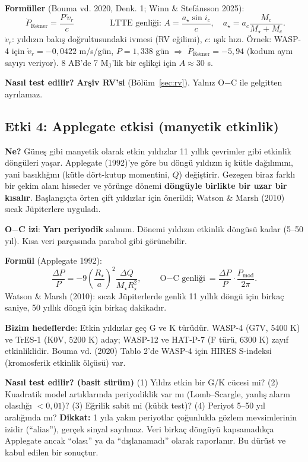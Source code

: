 \textbf{Formüller} (Bouma vd. 2020, Denk. 1; Winn \& Stefánsson 2025):
\[
\boxed{\;\dot P_\text{Rømer} = \frac{P\,\dot v_r}{c}\;}
\qquad\qquad
\text{LTTE genliği: } A = \frac{a_\star \sin i_c}{c},\quad a_\star = a_c\frac{M_c}{M_\star+M_c}.
\]
$\dot v_r$: yıldızın bakış doğrultusundaki ivmesi (RV eğilimi), $c$: ışık hızı. Örnek: WASP-4 için
$\dot v_r = -0{,}0422$ m/s/gün, $P = 1{,}338$ gün $\Rightarrow$ $\dot P_\text{Rømer} = -5{,}94$\msyil{} (kodum aynı sayıyı
veriyor). 8 AB'de 7 M$_\mathrm{J}$'lik bir eşlikçi için $A \approx 30$ s.

\textbf{Nasıl test edilir?} \textbf{Arşiv RV'si} (Bölüm~\ref{sec:rv}). Yalnız O$-$C ile gelgitten ayrılamaz.

\subsection{Etki 4: Applegate etkisi (manyetik etkinlik)}
\textbf{Ne?} Güneş gibi manyetik olarak etkin yıldızlar 11 yıllık çevrimler gibi etkinlik döngüleri yaşar. Applegate
(1992)'ye göre bu döngü yıldızın iç kütle dağılımını, yani basıklığını (kütle dört-kutup momentini, $Q$) değiştirir.
Gezegen biraz farklı bir çekim alanı hisseder ve yörünge dönemi \textbf{döngüyle birlikte bir uzar bir kısalır}.
Başlangıçta örten çift yıldızlar için önerildi; Watson \& Marsh (2010) sıcak Jüpiterlere uyguladı.

\textbf{O$-$C izi}: \textbf{Yarı periyodik} salınım. Dönemi yıldızın etkinlik döngüsü kadar (5–50 yıl). Kısa veri
parçasında parabol gibi görünebilir.

\textbf{Formül} (Applegate 1992):
\[
\frac{\Delta P}{P} = -9\left(\frac{R_\star}{a}\right)^2\frac{\Delta Q}{M_\star R_\star^2},
\qquad
\text{O$-$C genliği} = \frac{\Delta P}{P}\cdot\frac{P_\text{mod}}{2\pi}.
\]
Watson \& Marsh (2010): sıcak Jüpiterlerde genlik 11 yıllık döngü için birkaç saniye, 50 yıllık döngü için birkaç
dakikadır.

\textbf{Bizim hedeflerde}: Etkin yıldızlar geç G ve K türüdür. WASP-4 (G7V, 5400 K) ve TrES-1 (K0V, 5200 K) aday;
WASP-12 ve HAT-P-7 (F türü, 6300 K) zayıf etkinliklidir. Bouma vd. (2020) Tablo 2'de WASP-4 için HIRES S-indeksi
(kromosferik etkinlik ölçüsü) var.

\textbf{Nasıl test edilir? (basit sürüm)} (1) Yıldız etkin bir G/K cücesi mi? (2) Kuadratik model artıklarında
periyodiklik var mı (Lomb–Scargle, yanlış alarm olasılığı $<0{,}01$)? (3) Eğrilik sabit mi (kübik test)?
(4) Periyot 5–50 yıl aralığında mı? \textbf{Dikkat:} 1 yıla yakın periyotlar çoğunlukla gözlem mevsimlerinin izidir
(“alias”), gerçek sinyal sayılmaz. Veri birkaç döngüyü kapsamadıkça Applegate ancak “olası” ya da “dışlanamadı” olarak
raporlanır. Bu dürüst ve kabul edilen bir sonuçtur.

